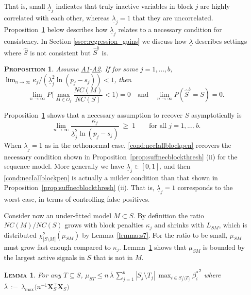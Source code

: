 \documentclass[bj,authoryear]{imsart}
\theoremstyle{plain}
\newtheorem{prop}[thm]{\textsc{Proposition}}
\newtheorem{lem}[thm]{\textsc{Lemma}}
\newcommand{\bs}{\boldsymbol}
\begin{document}
That is, small $\underline{\lambda}_j$ indicates that truly inactive variables in block $j$ are highly correlated with each other, whereas $\underline{\lambda}_j=1$ that they are uncorrelated. Proposition~\ref{prop:nectypeIreg} below describes how $\underline{\lambda}_j$ relates to a necessary condition for consistency.
In Section \ref{ssec:regression_gains} we discuss how $\underline{\lambda}$ describes settings where $\hat S$ is not consistent but $\hat S^b$ is. 
\begin{prop}\label{prop:nectypeIreg}
Assume \hyperlink{lab:A1}{A1}-\hyperlink{lab:A2}{A2}.
     If for some $j=1,\ldots,b$,  $\lim_{n\to\infty}\kappa_j/(\underline{\lambda}_j^2\ln(p_j-s_j)) <1$, then  %
     $$\lim_{n \to \infty} P\Big(\max_{M\in O_j}\frac{NC(M)}{NC(S)}<1\Big)= 0 \quad\text{and}\quad \lim_{n \to \infty} P(\hat{S}^b=S)= 0.$$
\end{prop}



Proposition~\ref{prop:nectypeIreg} shows that 
a necessary assumption to recover $S$ asymptotically
is 
\begin{equation}\label{cond:necIallblockpen}
\lim_{n\to\infty}\frac{\kappa_j}{\underline{\lambda}_j^2\ln(p_j-s_j)}\;\geq\;1\qquad\mbox{for all }j=1,\ldots,b.
\end{equation}
When $\underline{\lambda}_j=1$ as in the orthonormal case, \eqref{cond:necIallblockpen} recovers %
the necessary condition shown in Proposition~\ref{prop:suffnecblockthresh} (ii) for the sequence model. More generally we have $\underline{\lambda}_j \in [0,1]$, and then \eqref{cond:necIallblockpen} is actually a milder condition than that shown in Proposition~\ref{prop:suffnecblockthresh} (ii). That is, $\underline{\lambda}_j=1$ corresponds to the worst case, in terms of controlling false positives.

Consider now an under-fitted model $M\subset S$. %
By definition the ratio $NC(M)/NC(S)$ %
grows with block penalties $\kappa_j$ and shrinks with $L_{SM}$, which is distributed $\chi^2_{|S\setminus M|}(\mu_{SM})$ by Lemma~\ref{lemma:s7}.
For the ratio to be small, $\mu_{SM}$ must grow
fast enough compared to $\kappa_j$. Lemma~\ref{lem:upperboundnoncentral} shows that $\mu_{SM}$ is bounded by the largest active signals in $S$ that is not in $M$.
\begin{lem}\label{lem:upperboundnoncentral}
    For any $T\subseteq S$, $\mu_{ST} \leq n\,\bar{\lambda}\,\sum_{j=1}^b|S_j\setminus T_j|\,\max_{i\in S_j\setminus T_j}{\beta_{i}^*}^2$  where $\bar{\lambda}\,:=\,\lambda_{\max}\Big(n^{-1} \bs X_{S}^\top\bs X_{S}\Big)$
\end{lem}
\end{document}
